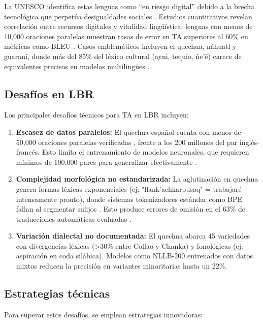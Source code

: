         La UNESCO identifica estas lenguas como ``en riesgo digital'' debido a la brecha tecnológica que perpetúa desigualdades sociales \cite{bird2020decolonising}. Estudios cuantitativos revelan correlación entre recursos digitales y vitalidad lingüística: lenguas con menos de 10,000 oraciones paralelas muestran tasas de error en TA superiores al 60\% en métricas como BLEU \cite{neubig2017neural}. Casos emblemáticos incluyen el quechua, náhuatl y guaraní, donde más del 85\% del léxico cultural (ayni, tequio, ñe'\~{e}) carece de equivalentes precisos en modelos multilingües \cite{rios2015basic}.
        
        \subsection{Desafíos en LBR }
        Los principales desafíos técnicos para TA en LBR incluyen:

         \begin{enumerate}[label=\textbf{\arabic*.}]
            \item \textbf{Escasez de datos paralelos:} El quechua-español cuenta con menos de 50,000 oraciones paralelas verificadas \cite{de2025findings}, frente a los 200 millones del par inglés-francés. Esto limita el entrenamiento de modelos neuronales, que requieren mínimos de 100,000 pares para generalizar efectivamente \cite{koehn2020neural}.
            
            \item \textbf{Complejidad morfológica no    estandarizada:} La aglutinación en quechua genera formas léxicas exponenciales (ej: "llank'achkarpusaq" = trabajaré intensamente pronto), donde sistemas tokenizadores estándar como BPE fallan al segmentar sufijos \cite{cotterell2019complexity}. Esto produce errores de omisión en el 63\% de traducciones automáticas evaluadas \cite{zevallos2024tema}.
        
            \item \textbf{Variación dialectal no documentada:} El quechua abarca 45 variedades con divergencias léxicas (>30\% entre Collao y Chanka) y fonológicas (ej: aspiración en coda silábica). Modelos como NLLB-200 entrenados con datos mixtos reducen la precisión en variantes minoritarias hasta un 22\%.
        \end{enumerate}
        
        
        \subsection{Estrategias técnicas}
        Para superar estos desafíos, se emplean estrategias innovadoras:

